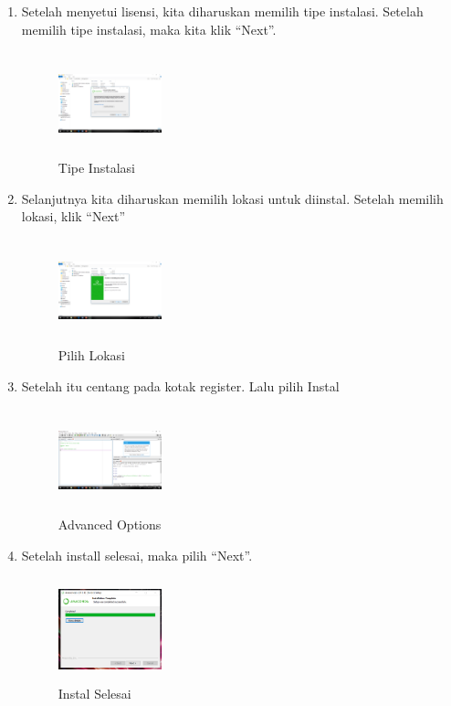 \begin{enumerate}
\item Setelah menyetui lisensi, kita diharuskan memilih tipe instalasi. Setelah memilih tipe instalasi, maka kita klik “Next”.
\begin{figure}[!htbp]
    \centering
    \includegraphics[width=3cm,height=3cm]{figures/4.png}
    \caption{Tipe Instalasi}
    \label{instalasi}
    \end{figure}

\item Selanjutnya kita diharuskan memilih lokasi untuk diinstal. Setelah memilih lokasi, klik “Next”
\begin{figure}[!htbp]
    \centering
    \includegraphics[width=3cm,height=3cm]{figures/5.png}
    \caption{Pilih Lokasi}
    \label{lokasi}
    \end{figure}

\item Setelah itu centang pada kotak register. Lalu pilih Instal
\begin{figure}[!htbp]
    \centering
    \includegraphics[width=3cm,height=3cm]{figures/6.png}
    \caption{Advanced Options}
    \label{options}
    \end{figure}

\item Setelah install selesai, maka pilih “Next”.
\begin{figure}[!htbp]
    \centering
    \includegraphics[width=3cm,height=3cm]{figures/7.png}
    \caption{Instal Selesai}
    \label{instal}
    \end{figure}


\end{enumerate}
